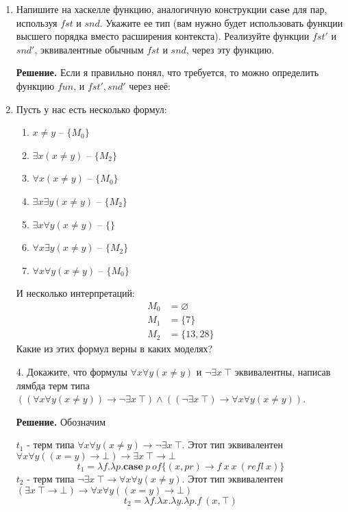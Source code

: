 \begin{enumerate}
\item Напишите на хаскелле функцию, аналогичную конструкции $\mathbf{case}$ для пар, используя $fst$ и $snd$.
    Укажите ее тип (вам нужно будет использовать функции высшего порядка вместо расширения контекста).
    Реализуйте функции $fst'$ и $snd'$, эквивалентные обычным $fst$ и $snd$, через эту функцию.

\textbf{Решение.} Если я правильно понял, что требуется, то можно определить функцию $fun$, и $fst', snd'$ через неё:




\item Пусть у нас есть несколько формул:
\begin{enumerate}
\item \label{it:no} $x \neq y$ -- $\{M_0\}$
\item \label{it:e} $\exists x (x \neq y)$ -- $\{M_2\}$
\item \label{it:a} $\forall x (x \neq y)$ -- $\{M_0\}$
\item \label{it:ee} $\exists x \exists y (x \neq y)$ -- $\{M_2\}$
\item \label{it:ea} $\exists x \forall y (x \neq y)$ -- $\{\}$
\item \label{it:ae} $\forall x \exists y (x \neq y)$ -- $\{M_2\}$
\item \label{it:aa} $\forall x \forall y (x \neq y)$ -- $\{M_0\}$
\end{enumerate}
И несколько интерпретаций:
\begin{align*}
M_0 & = \varnothing \\
M_1 & = \{ 7 \} \\
M_2 & = \{ 13, 28 \}
\end{align*}
Какие из этих формул верны в каких моделях?

\item[4.] Докажите, что формулы $\forall x \forall y (x \neq y)$ и $\neg \exists x\ \top$ эквивалентны,
    написав лямбда терм типа $((\forall x \forall y (x \neq y)) \to \neg \exists x\ \top) \land ((\neg \exists x\ 
    \top) \to \forall x \forall y (x \neq y))$.
    
\textbf{Решение.} Обозначим 

$t_1$ - терм типа $\forall x \forall y (x \neq y) \to \neg \exists x\ \top$. 
Этот тип эквивалентен $\forall x \forall y ((x = y) \to \bot) \to \exists x\ \top \to \bot$ 
\begin{equation*}
	t_1 = \lambda f.\lambda p. \mathbf{case}\ p \ of \{ (x, pr ) \to f \ x\ x \ (refl \ x) \} 
\end{equation*}
$t_2$ - терм типа $\neg \exists x\ \top \to \forall x \forall y (x \neq y)$. 
Этот тип эквивалентен $(\exists x\ \top \to \bot) \to \forall x \forall y ((x = y) \to \bot)$
\begin{equation*}
	t_2 = \lambda f. \lambda x. \lambda y.\lambda p. f\ (x, \top)
\end{equation*}


\end{enumerate}
